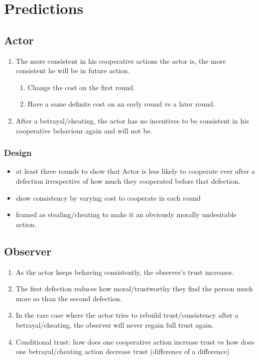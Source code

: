 \documentclass[11pt]{article}
\theoremstyle{plainCl1}
\begin{document}
\newpage
\section{Predictions}

\subsection{Actor}

\begin{enumerate}
    \item The more consistent in his cooperative actions the actor is, the more consistent he will be in future action.
    \begin{enumerate}
        \item Change the cost on the first round.
        \item Have a same definite cost on an early round vs a later round. 
    \end{enumerate}
    \item After a betrayal/cheating, the actor has no incentives to be consistent in his cooperative behaviour again and will not be. 
\end{enumerate}

\subsubsection{Design}

\begin{itemize}
    \item at least three rounds to show that Actor is less likely to cooperate ever after a defection irrespective of how much they cooperated before that defection.
    \item show consistency by varying cost to cooperate in each round
    \item framed as stealing/cheating to make it an obviously morally undesirable action.
\end{itemize}


\subsection{Observer}

\begin{enumerate}
    \item As the actor keeps behaving consistently, the observer's trust increases.
    \item The first defection reduces how moral/trustworthy they find the person much more so than the second defection.
    \item In the rare case where the actor tries to rebuild trust/consistency after a betrayal/cheating, the observer will never regain full trust again.
    \item Conditional trust: how does one cooperative action increase trust vs how does one betrayal/cheating action decrease trust (difference of a difference)
\end{enumerate}
\end{document}
